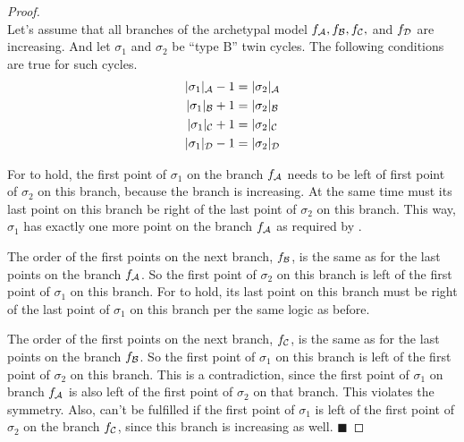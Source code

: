 \begin{proof} \phantom{x} \\
	Let's assume that all branches of the archetypal model $f_{\mathcal{A}}, f_{\mathcal{B}}, f_{\mathcal{C}},$ and $f_{\mathcal{D}}$ are increasing.
	And let $\sigma_1$ and $\sigma_2$ be ``type B'' twin cycles.
	The following conditions are true for such cycles.
	\begin{subequations}
		\begin{align}
			|\sigma_1|_{\mathcal{A}} - 1 & = |\sigma_2|_{\mathcal{A}} \label{equ:add.change.conseq.sigmaA} \\
			|\sigma_1|_{\mathcal{B}} + 1 & = |\sigma_2|_{\mathcal{B}} \label{equ:add.change.conseq.sigmaB} \\
			|\sigma_1|_{\mathcal{C}} + 1 & = |\sigma_2|_{\mathcal{C}} \label{equ:add.change.conseq.sigmaC} \\
			|\sigma_1|_{\mathcal{D}} - 1 & = |\sigma_2|_{\mathcal{D}} \label{equ:add.change.conseq.sigmaD}
		\end{align}
	\end{subequations}

	For  to hold, the first point of $\sigma_1$ on the branch $f_{\mathcal{A}}$ needs to be left of first point of $\sigma_2$ on this branch, because the branch is increasing.
	At the same time must its last point on this branch be right of the last point of $\sigma_2$ on this branch.
	This way, $\sigma_1$ has exactly one more point on the branch $f_{\mathcal{A}}$ as required by .

	The order of the first points on the next branch, $f_{\mathcal{B}}$, is the same as for the last points on the branch $f_{\mathcal{A}}$.
	So the first point of $\sigma_2$ on this branch is left of the first point of $\sigma_1$ on this branch.
	For  to hold, its last point on this branch must be right of the last point of $\sigma_1$ on this branch per the same logic as before.

	The order of the first points on the next branch, $f_{\mathcal{C}}$, is the same as for the last points on the branch $f_{\mathcal{B}}$.
	So the first point of $\sigma_1$ on this branch is left of the first point of $\sigma_2$ on this branch.
	This is a contradiction, since the first point of $\sigma_1$ on branch $f_{\mathcal{A}}$ is also left of the first point of $\sigma_2$ on that branch.
	This violates the symmetry.
	Also,  can't be fulfilled if the first point of $\sigma_1$ is left of the first point of $\sigma_2$ on the branch $f_{\mathcal{C}}$, since this branch is increasing as well.
	\hfill $\blacksquare$
\end{proof}
